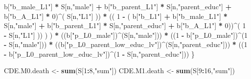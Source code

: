 \documentclass[
]{book}
\newenvironment{Shaded}{\begin{snugshade}}{\end{snugshade}}
\newcommand{\DecValTok}[1]{\textcolor[rgb]{0.00,0.00,0.81}{#1}}
\newcommand{\FunctionTok}[1]{\textcolor[rgb]{0.13,0.29,0.53}{\textbf{#1}}}
\newcommand{\NormalTok}[1]{#1}
\newcommand{\OtherTok}[1]{\textcolor[rgb]{0.56,0.35,0.01}{#1}}
\newcommand{\SpecialCharTok}[1]{\textcolor[rgb]{0.81,0.36,0.00}{\textbf{#1}}}
\newcommand{\StringTok}[1]{\textcolor[rgb]{0.31,0.60,0.02}{#1}}
\begin{document}
\begin{Shaded}
\begin{Highlighting}[]
\NormalTok{                           b[}\StringTok{"b\_male\_L1"}\NormalTok{] }\SpecialCharTok{*}\NormalTok{ S[n,}\StringTok{"male"}\NormalTok{] }\SpecialCharTok{+}  
\NormalTok{                           b[}\StringTok{"b\_parent\_L1"}\NormalTok{] }\SpecialCharTok{*}\NormalTok{ S[n,}\StringTok{"parent\_educ"}\NormalTok{] }\SpecialCharTok{+}
\NormalTok{                           b[}\StringTok{"b\_A\_L1"}\NormalTok{] }\SpecialCharTok{*} \DecValTok{0}\NormalTok{)}\SpecialCharTok{\^{}}\NormalTok{( S[n,}\StringTok{"L1"}\NormalTok{] )) }\SpecialCharTok{*}
\NormalTok{                      (( }\DecValTok{1} \SpecialCharTok{{-}}\NormalTok{ ( b[}\StringTok{"b\_L1"}\NormalTok{] }\SpecialCharTok{+}
\NormalTok{                                 b[}\StringTok{"b\_male\_L1"}\NormalTok{] }\SpecialCharTok{*}\NormalTok{ S[n,}\StringTok{"male"}\NormalTok{] }\SpecialCharTok{+}  
\NormalTok{                                 b[}\StringTok{"b\_parent\_L1"}\NormalTok{] }\SpecialCharTok{*}\NormalTok{ S[n,}\StringTok{"parent\_educ"}\NormalTok{] }\SpecialCharTok{+}
\NormalTok{                                 b[}\StringTok{"b\_A\_L1"}\NormalTok{] }\SpecialCharTok{*} \DecValTok{0}\NormalTok{))}\SpecialCharTok{\^{}}\NormalTok{( }\DecValTok{1} \SpecialCharTok{{-}}\NormalTok{ S[n,}\StringTok{"L1"}\NormalTok{] )) ) ) }\SpecialCharTok{*}
\NormalTok{      ((b[}\StringTok{"p\_L0\_male"}\NormalTok{])}\SpecialCharTok{\^{}}\NormalTok{(S[n,}\StringTok{"male"}\NormalTok{])) }\SpecialCharTok{*} 
\NormalTok{      ((}\DecValTok{1} \SpecialCharTok{{-}}\NormalTok{ b[}\StringTok{"p\_L0\_male"}\NormalTok{])}\SpecialCharTok{\^{}}\NormalTok{(}\DecValTok{1} \SpecialCharTok{{-}}\NormalTok{ S[n,}\StringTok{"male"}\NormalTok{])) }\SpecialCharTok{*} 
\NormalTok{      ((b[}\StringTok{"p\_L0\_parent\_low\_educ\_lv"}\NormalTok{])}\SpecialCharTok{\^{}}\NormalTok{(S[n,}\StringTok{"parent\_educ"}\NormalTok{])) }\SpecialCharTok{*}
\NormalTok{      ((}\DecValTok{1} \SpecialCharTok{{-}}\NormalTok{ b[}\StringTok{"p\_L0\_parent\_low\_educ\_lv"}\NormalTok{])}\SpecialCharTok{\^{}}\NormalTok{(}\DecValTok{1} \SpecialCharTok{{-}}\NormalTok{ S[n,}\StringTok{"parent\_educ"}\NormalTok{])) }
\NormalTok{    \}}
  
\NormalTok{  CDE.M0.death }\OtherTok{\textless{}{-}} \FunctionTok{sum}\NormalTok{(S[}\DecValTok{1}\SpecialCharTok{:}\DecValTok{8}\NormalTok{,}\StringTok{"sum"}\NormalTok{])}
\NormalTok{  CDE.M1.death }\OtherTok{\textless{}{-}} \FunctionTok{sum}\NormalTok{(S[}\DecValTok{9}\SpecialCharTok{:}\DecValTok{16}\NormalTok{,}\StringTok{"sum"}\NormalTok{])}
  

\end{Highlighting}
\end{Shaded}
\end{document}
